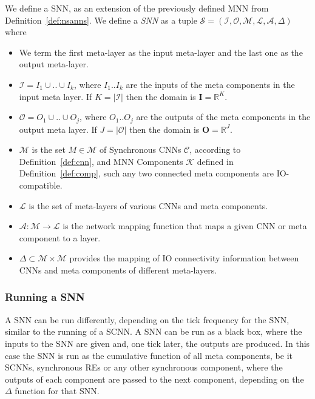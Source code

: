 \begin{definition}
	\label{def:snn}
	We define a \ac{SNN}, as an extension of the previously defined \ac{MNN} from Definition~\ref{def:nsanns}. 
	We define a \emph{\ac{SNN}} as a tuple $\mathcal{S} = (\mathcal{I}, \mathcal{O}, \mathcal{M}, \mathcal{L}, \mathcal{A}, \Delta)$ where
	\begin{itemize}
		\item We term the first meta-layer as the input meta-layer and the last one as the output meta-layer.
		\item  $\mathcal{I}=I_1 \cup .. \cup I_k$, where $I_1..I_k$ are the inputs of the meta components in the input meta layer. If $K=|\mathcal{I}|$ then the domain is $\mathbf{I} = \mathbb{R}^K$.
		\item $\mathcal{O}=O_1 \cup .. \cup O_j$, where $O_1..O_j$ are the outputs of the meta components in the output meta layer. If $J=|\mathcal{O}|$ then the domain is $\mathbf{O} = \mathbb{R}^J$.
		\item $\mathcal{M}$ is the set $M \in \mathcal{M}$ of Synchronous \acp{CNN} $\mathcal{C}$, according to Definition~\ref{def:cnn}, and \ac{MNN} Components $\mathcal{K}$ defined in Definition~\ref{def:comp}, such any two connected meta components are IO-compatible.
		\item $\mathcal{L}$ is the set of meta-layers of various \acp{CNN} and meta components.
		\item $\mathcal{A}: \mathcal{M} \rightarrow \mathcal{L}$ is the network mapping function that maps a given \ac{CNN} or meta component to a layer.
		\item $\Delta \subset \mathcal{M} \times \mathcal{M}$ provides the mapping of IO connectivity information between \acp{CNN} and meta components of different meta-layers.
	\end{itemize}
\end{definition}

\subsubsection{Running a \ac{SNN}}
A \ac{SNN} can be run differently, depending on the tick frequency for the \ac{SNN}, similar to the running of a \ac{SCNN}.
A \ac{SNN} can be run as a black box, where the inputs to the \ac{SNN} are given and, one tick later, the outputs are produced.
In this case the \ac{SNN} is run as the cumulative function of all meta components, be it \acp{SCNN}, synchronous \acp{RE} or any other synchronous component, where the outputs of each component are passed to the next component, depending on the $\Delta$ function for that \ac{SNN}.

